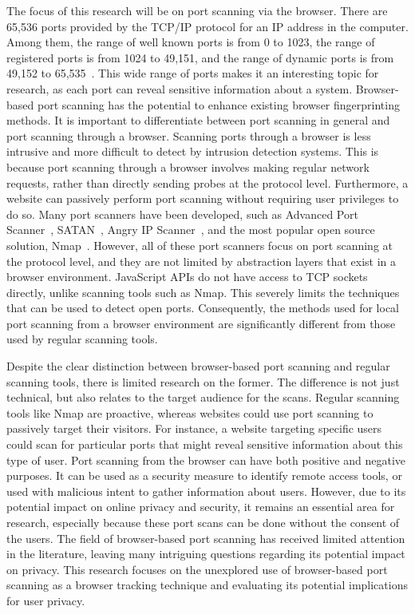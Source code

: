 The focus of this research will be on port scanning via the browser. There are 65,536 ports provided by the TCP/IP protocol for an IP address in the computer. Among them, the range of well known ports is from 0 to 1023, the range of registered ports is from 1024 to 49,151, and the range of dynamic ports is from 49,152 to 65,535~.
This wide range of ports makes it an interesting topic for research, as each port can reveal sensitive information about a system. Browser-based port scanning has the potential to enhance existing browser fingerprinting methods.
It is important to differentiate between port scanning in general and port scanning through a browser. 
Scanning ports through a browser is less intrusive and more difficult to detect by intrusion detection systems. This is because port scanning through a browser involves making regular network requests, rather than directly sending probes at the protocol level. Furthermore, a website can passively perform port scanning without requiring user privileges to do so.
Many port scanners have been developed, such as Advanced Port Scanner~, SATAN~, Angry IP Scanner~, and the most popular open source solution, Nmap~. However, all of these port scanners focus on port scanning at the protocol level, and they are not limited by abstraction layers that exist in a browser environment. JavaScript APIs do not have access to TCP sockets directly, unlike scanning tools such as Nmap. This severely limits the techniques that can be used to detect open ports. Consequently, the methods used for local port scanning from a browser environment are significantly different from those used by regular scanning tools.

Despite the clear distinction between browser-based port scanning and regular scanning tools, there is limited research on the former. The difference is not just technical, but also relates to the target audience for the scans. Regular scanning tools like Nmap are proactive, whereas websites could use port scanning to passively target their visitors. For instance, a website targeting specific users could scan for particular ports that might reveal sensitive information about this type of user.
Port scanning from the browser can have both positive and negative purposes. It can be used as a security measure to identify remote access tools, or used with malicious intent to gather information about users. However, due to its potential impact on online privacy and security, it remains an essential area for research, especially because these port scans can be done without the consent of the users.
The field of browser-based port scanning has received limited attention in the literature, leaving many intriguing questions regarding its potential impact on privacy. This research focuses on the unexplored use of browser-based port scanning as a browser tracking technique and evaluating its potential implications for user privacy. 


